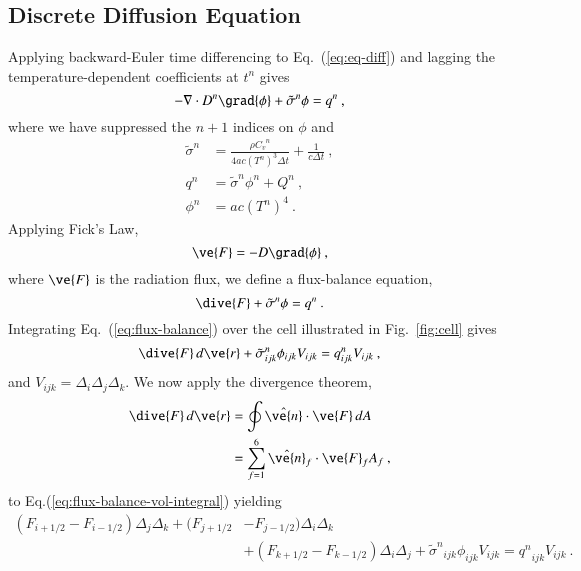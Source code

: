 \documentclass[preprint,12pt]{elsarticle}
\newcommand{\Cv}{\ensuremath{C_{v}}}
\newcommand{\dt}{\ensuremath{\Delta t}}
\newcommand{\sign}{\ensuremath{\tilde{\sigma}^n}}
\newcommand{\qn}{\ensuremath{q^n}}
\newcommand{\Tn}{\ensuremath{T^n}}
\newcommand{\Dn}{\ensuremath{D^n}}
\newcommand{\phin}{\ensuremath{\phi^n}}
\newcommand{\Di}{\ensuremath{\Delta_i}}
\newcommand{\Dj}{\ensuremath{\Delta_j}}
\newcommand{\Dk}{\ensuremath{\Delta_k}}
\begin{document}
\subsection{Discrete Diffusion Equation}

Applying backward-Euler time differencing to Eq.~(\ref{eq:eq-diff})
and lagging the temperature-dependent coefficients at $t^n$ gives
\begin{equation}
  -\nabla\cdot \Dn\grad{\phi} + \sign\phi = \qn\:,
\end{equation}
where we have suppressed the $n+1$ indices on $\phi$ and 
\begin{align}
  \sign &= \frac{\rho \Cv^n}{4ac(\Tn)^3\dt} + \frac{1}{c\dt}\:,\\
  \qn &= \sign\phin + Q^n\:,\\
  \phin &= ac(\Tn)^4\:.
\end{align}
Applying Fick's Law,
\begin{equation}
  \ve{F} = -D\grad{\phi}\:,
  \label{eq:fick}
\end{equation}
where $\ve{F}$ is the radiation flux, we define a flux-balance
equation,
\begin{equation}
  \dive{F} + \sign\phi = \qn\:.
  \label{eq:flux-balance}
\end{equation}
Integrating Eq.~(\ref{eq:flux-balance}) over the cell illustrated in
Fig.~\ref{fig:cell} gives
\begin{equation}
  \iiint\dive{F}\,d\ve{r} +
  \sign_{ijk}\phi_{ijk}V_{ijk}=\qn_{ijk}V_{ijk}\:,
  \label{eq:flux-balance-vol-integral}
\end{equation}
and $V_{ijk} = \Delta_i\Delta_j\Delta_k$.  We now apply the divergence
theorem,
\begin{equation}
  \begin{split}
    \iiint\dive{F}\,d\ve{r} &= \oint\hat{\ve{n}}\cdot\ve{F}\,dA\\
    &= \sum_{f=1}^{6}\hat{\ve{n}}_f\cdot\ve{F}_f A_f\:,
  \end{split}
\end{equation}
to Eq.(\ref{eq:flux-balance-vol-integral}) yielding
\begin{equation}
  \begin{split}
    (F_{i+1/2} - F_{i-1/2})\Dj\Dk + (F_{j+1/2} &- F_{j-1/2})\Di\Dk \\
    &+ (F_{k+1/2} - F_{k-1/2})\Di\Dj
    + \sign_{ijk}\phi_{ijk}V_{ijk} = \qn_{ijk}V_{ijk}\:.
  \end{split}
  \label{eq:flux-balance-difference}
\end{equation}
\end{document}

